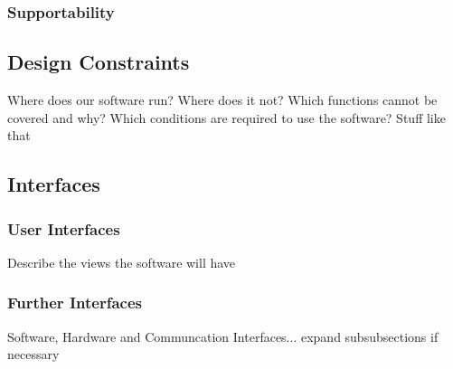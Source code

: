 \subsubsection{Supportability}
\label{sec:domainBcd}

\subsection{Design Constraints}
\label{sec:domainBd}
Where does our software run? Where does it not? Which functions cannot be covered and why? Which conditions are required to use the software? Stuff like that

\subsection{Interfaces}
\label{sec:domainBe}
\subsubsection{User Interfaces}
\label{sec:domainBea}
Describe the views the software will have
\subsubsection{Further Interfaces}
\label{sec:domainBeb}
Software, Hardware and Communcation Interfaces... expand subsubsections if necessary
